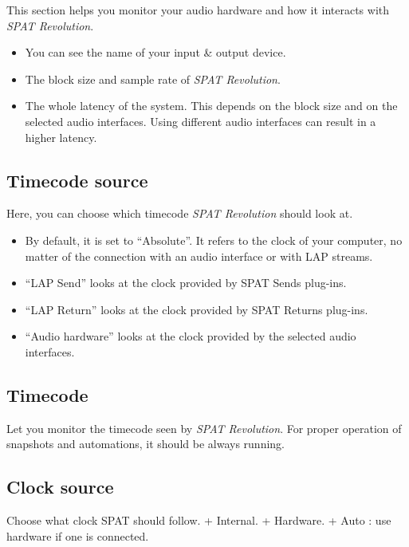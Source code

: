 \documentclass[
  letterpaper,
  DIV=11,
  numbers=noendperiod]{scrreport}
\providecommand{\tightlist}{%
  \setlength{\itemsep}{0pt}\setlength{\parskip}{0pt}}\usepackage{longtable,booktabs,array}
\begin{document}
This section helps you monitor your audio hardware and how it interacts
with \emph{SPAT Revolution}.

\begin{itemize}
\tightlist
\item
  You can see the name of your input \& output device.
\item
  The block size and sample rate of \emph{SPAT Revolution}.
\item
  The whole latency of the system. This depends on the block size and on
  the selected audio interfaces. Using different audio interfaces can
  result in a higher latency.
\end{itemize}

\hypertarget{timecode-source}{%
\subsection{Timecode source}\label{timecode-source}}

Here, you can choose which timecode \emph{SPAT Revolution} should look
at.

\begin{itemize}
\tightlist
\item
  By default, it is set to ``Absolute''. It refers to the clock of your
  computer, no matter of the connection with an audio interface or with
  LAP streams.
\item
  ``LAP Send'' looks at the clock provided by SPAT Sends plug-ins.
\item
  ``LAP Return'' looks at the clock provided by SPAT Returns plug-ins.
\item
  ``Audio hardware'' looks at the clock provided by the selected audio
  interfaces.
\end{itemize}

\hypertarget{timecode}{%
\subsection{Timecode}\label{timecode}}

Let you monitor the timecode seen by \emph{SPAT Revolution}. For proper
operation of snapshots and automations, it should be always running.

\hypertarget{clock-source}{%
\subsection{Clock source}\label{clock-source}}

Choose what clock SPAT should follow. + Internal. + Hardware. + Auto :
use hardware if one is connected.
\end{document}
